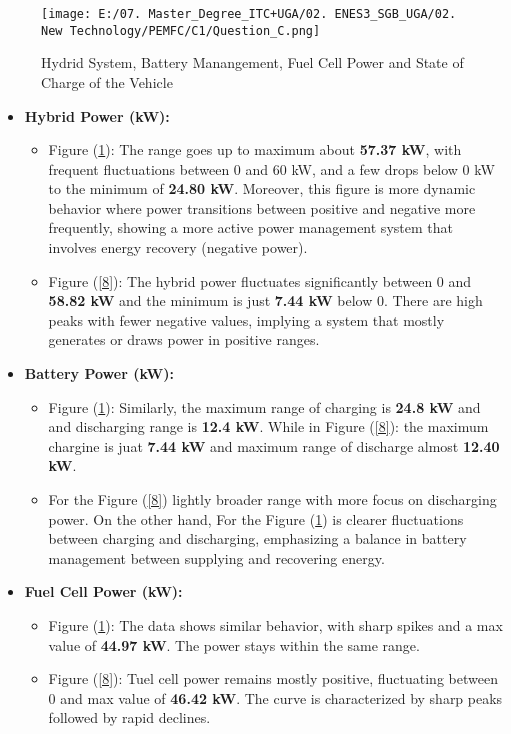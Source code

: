\documentclass[12pt,a4paper]{article}
\numberwithin{equation}{section}
\begin{document}
\begin{figure}[h]
	\centering 
	\texttt{[image: E:/07. Master\_Degree\_ITC+UGA/02. ENES3\_SGB\_UGA/02. New Technology/PEMFC/C1/Question\_C.png]}
	\caption{\small {Hydrid System, Battery Manangement, Fuel Cell Power and State of Charge of the Vehicle}}
	\label{20}
\end{figure}
\begin{itemize}
	\item \textbf{Hybrid Power (kW):}
	\begin{itemize}
		\item {Figure (\ref{20}):} The range goes up to maximum about \textbf{57.37 kW}, with frequent fluctuations between 0 and 60 kW, and a few drops below 0 kW to the minimum of \textbf{24.80 kW}. Moreover, this figure is more dynamic behavior where power transitions between positive and negative more frequently, showing a more active power management system that involves energy recovery (negative power).
		\item {Figure (\ref{8}):} The hybrid power fluctuates significantly between 0 and \textbf{58.82 kW} and the minimum is just \textbf{7.44 kW} below 0. There are high peaks with fewer negative values, implying a system that mostly generates or draws power in positive ranges.
	\end{itemize}
	
	\item \textbf{Battery Power (kW):}
	\begin{itemize}
		\item {Figure (\ref{20}):} Similarly, the maximum range of charging is \textbf{24.8 kW} and and discharging range is \textbf{12.4 kW}. While in {Figure (\ref{8}):} the maximum chargine is juat \textbf{7.44 kW} and maximum range of discharge almost \textbf{12.40 kW}. 
		\item For the Figure (\ref{8}) lightly broader range with more focus on discharging power.
		On the other hand, For the Figure (\ref{20}) is clearer fluctuations between charging and discharging, emphasizing a balance in battery management between supplying and recovering energy.
	\end{itemize}
	
	\item \textbf{Fuel Cell Power (kW):}
	\begin{itemize}
		\item {Figure (\ref{20}):} The data shows similar behavior, with sharp spikes and a max value of \textbf{44.97 kW}. The power stays within the same range.
		\item {Figure (\ref{8}):} Tuel cell power remains mostly positive, fluctuating between 0 and max value of \textbf{46.42 kW}. The curve is characterized by sharp peaks followed by rapid declines.
	\end{itemize}
	

\end{itemize}
\end{document}
